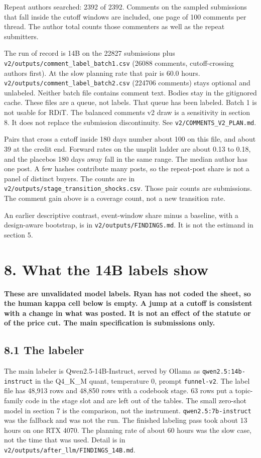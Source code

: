 \documentclass[11pt]{article}
\begin{document}
Repeat authors searched: 2392 of 2392. Comments on the sampled submissions that fall inside the cutoff windows are included, one page of 100 comments per thread. The author total counts those commenters as well as the repeat submitters.


The run of record is 14B on the 22827 submissions plus \texttt{v2/outputs/comment\_label\_batch1.csv} (26088 comments, cutoff-crossing authors first). At the slow planning rate that pair is 60.0 hours. \texttt{v2/outputs/comment\_label\_batch2.csv} (224706 comments) stays optional and unlabeled. Neither batch file contains comment text. Bodies stay in the gitignored cache. These files are a queue, not labels. That queue has been labeled. Batch 1 is not usable for RDiT. The balanced comments v2 draw is a sensitivity in section 8. It does not replace the submission discontinuity. See \texttt{v2/COMMENTS\_V2\_PLAN.md}.


Pairs that cross a cutoff inside 180 days number about 100 on this file, and about 39 at the credit end. Forward rates on the unsplit ladder are about 0.13 to 0.18, and the placebos 180 days away fall in the same range. The median author has one post. A few hashes contribute many posts, so the repeat-post share is not a panel of distinct buyers. The counts are in \texttt{v2/outputs/stage\_transition\_shocks.csv}. Those pair counts are submissions. The comment gain above is a coverage count, not a new transition rate.


An earlier descriptive contrast, event-window share minus a baseline, with a design-aware bootstrap, is in \texttt{v2/outputs/FINDINGS.md}. It is not the estimand in section 5.


\section{8. What the 14B labels show}

\textbf{These are unvalidated model labels. Ryan has not coded the sheet, so the human kappa cell below is empty. A jump at a cutoff is consistent with a change in what was posted. It is not an effect of the statute or of the price cut. The main specification is submissions only.}


\subsection{8.1 The labeler}

The main labeler is Qwen2.5-14B-Instruct, served by Ollama as \texttt{qwen2.5:14b-instruct} in the Q4\_K\_M quant, temperature 0, prompt \texttt{funnel-v2}. The label file has 48,913 rows and 48,850 rows with a codebook stage. 63 rows put a topic-family code in the stage slot and are left out of the tables. The small zero-shot model in section 7 is the comparison, not the instrument. \texttt{qwen2.5:7b-instruct} was the fallback and was not the run. The finished labeling pass took about 13 hours on one RTX 4070. The planning rate of about 60 hours was the slow case, not the time that was used. Detail is in \texttt{v2/outputs/after\_llm/FINDINGS\_14B.md}.
\end{document}
